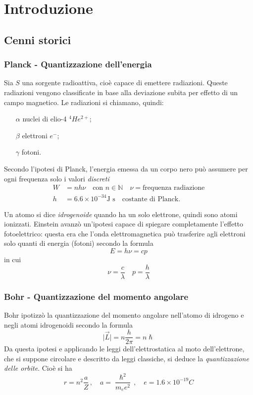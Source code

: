 \part{Introduzione}
\chapter{Cenni storici}
\section{Planck - Quantizzazione dell'energia}
Sia $S$ una sorgente radioattiva, cioè capace di emettere radiazioni. Queste radiazioni vengono classificate in base alla deviazione subita per effetto di un campo magnetico. Le radiazioni si chiamano, quindi:
\begin{itemize}
 \item[$\alpha$] nuclei di elio-4 $^4He^{2+}$;
 \item[$\beta$] elettroni $e^-$;
 \item[$\gamma$] fotoni. 
\end{itemize}

Secondo l'ipotesi di Planck, l'energia emessa da un corpo nero può assumere per ogni frequenza solo i valori \textit{discreti}
\begin{equation}\begin{split}
 W &= nh\nu\quad\text{con }n\in\mathbb{N}\quad\nu = \text{frequenza radiazione}\\
 h &= 6.6\times 10^{-34} \text{J s} \quad \text{costante di Planck.}
\end{split}\end{equation}

Un atomo si dice \textit{idrogenoide} quando ha un solo elettrone, quindi sono atomi ionizzati. Einstein avanzò un'ipotesi capace di spiegare completamente l'effetto fotoelettrico: questa era che l'onda elettromagnetica può trasferire agli elettroni solo quanti di energia (fotoni) secondo la formula
\begin{equation}
 \label{eq:energia_fotone}
 E = h\nu = cp
\end{equation}
in cui
\[
 \nu = \frac{c}{\lambda}\quad p = \frac{h}{\lambda}
\]
\section{Bohr - Quantizzazione del momento angolare}
Bohr ipotizzò la quantizzazione del momento angolare nell'atomo di idrogeno e negli atomi idrogenoidi secondo la formula
\begin{equation}
 \rvert\vec{L}\lvert = n\frac{h}{2\pi} = n\hslash
\end{equation}
Da questa ipotesi e applicando le leggi dell'elettrostatica al moto dell'elettrone, che si suppone circolare e descritto da leggi classiche, si deduce la \textit{quantizzazione delle orbite}. Cioè si ha
\begin{equation}
 r = n^2\frac{a}{Z}\,,\quad a=\frac{\hslash^2}{m_ee^2}\,,\quad e = 1.6\times 10^{-19}C
\end{equation}

